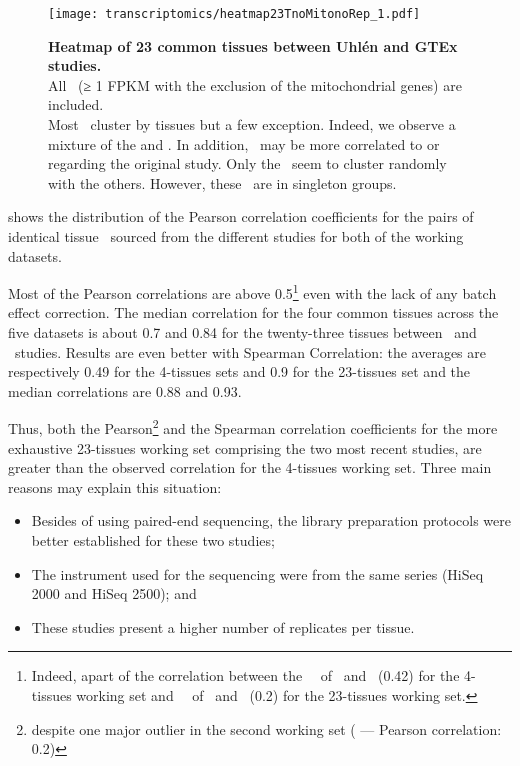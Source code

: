\begin{figure}[!htpb]
    \texttt{[image: transcriptomics/heatmap23TnoMitonoRep\_1.pdf]}\centering
    \caption[Heatmap of 23 common tissues between Uhlén and GTEx studies]%
    {\label{fig:noMitoNoRep23T}%
    \textbf{Heatmap of 23 common tissues between Uhlén and GTEx studies.}\\
    All \pcgs\ (≥ 1 FPKM with the exclusion of the mitochondrial
    genes) are included.\\Most \treps\ cluster by tissues but a few exception.
    Indeed, we observe a mixture of the 
    and  \treps.
    In addition,  \treps\ may be more correlated to
     or  regarding the original study.
    Only the  \treps\ seem to cluster randomly with the others.
    However, these \treps\ are in singleton groups.}
\end{figure}

 shows the distribution of the Pearson correlation
coefficients for the pairs of identical tissue \treps\
sourced from the different studies
for both of the working datasets.

Most of the Pearson correlations are above 0.5\footnote{Indeed, apart of the
correlation between the \Testis\ \treps\ of \castle\ and \vt\ (0.42)
for the 4-tissues working set and
\Salivary\ \treps\ of \uhlen\ and \gtex\ (0.2)
for the 23-tissues working set.}
even with the lack of any batch effect correction.
The median correlation for the four common tissues across the five datasets is
about 0.7 and 0.84 for the twenty-three tissues between \uhlen\ and \gtex\ studies.
Results are even better with Spearman Correlation:
the averages are respectively 0.49 for the 4-tissues sets
and 0.9 for the 23-tissues set and
the median correlations are 0.88 and 0.93.

Thus, both the Pearson\footnote{despite one major outlier in the second
working set (\tissue{Salivary gland} --- Pearson correlation: 0.2)} and the
Spearman correlation coefficients for the more exhaustive 23-tissues working set
comprising the two most recent studies,
are greater than the observed correlation for the 4-tissues working set.
Three main reasons may explain this situation:
\begin{itemize}[topsep=0pt,nosep]
    \item Besides of using paired-end sequencing,
        the library preparation protocols were better established
        for these two studies;
    \item The instrument used for the sequencing were
        from the same series (HiSeq 2000 and HiSeq 2500); and
    \item These studies present a higher number of replicates per tissue.
\end{itemize}

